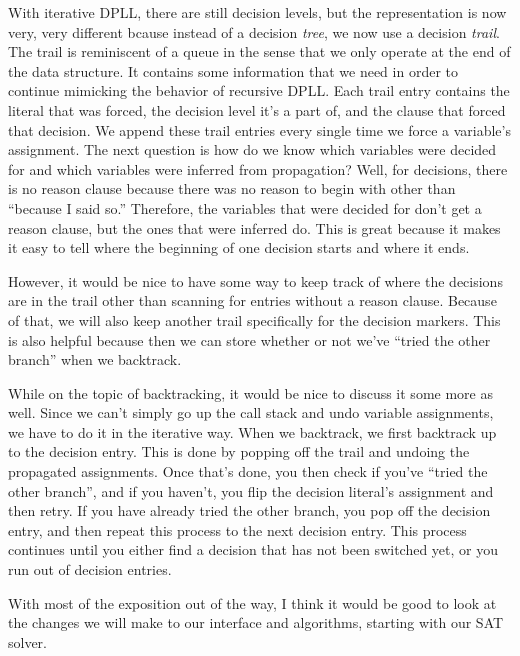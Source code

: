\documentclass[oneside]{book}
\begin{document}
With iterative DPLL, there are still decision levels, but the representation is 
now very, very different bcause instead of a decision \textit{tree}, we now use a 
decision \textit{trail}. The trail is reminiscent of a queue in the sense that 
we only operate at the end of the data structure. It contains some information 
that we need in order to continue mimicking the behavior of recursive DPLL. Each 
trail entry contains the literal that was forced, the decision level it's a part of,
and the clause that forced that decision. We append these trail entries every single 
time we force a variable's assignment. The next question is how do we know which 
variables were decided for and which variables were inferred from propagation?
Well, for decisions, there is no reason clause because there was no reason to 
begin with other than ``because I said so.'' Therefore, the variables that were 
decided for don't get a reason clause, but the ones that were inferred do. This 
is great because it makes it easy to tell where the beginning of one decision 
starts and where it ends.

However, it would be nice to have some way to keep track of where the decisions
are in the trail other than scanning for entries without a reason clause. Because 
of that, we will also keep another trail specifically for the decision markers.
This is also helpful because then we can store whether or not we've ``tried the 
other branch'' when we backtrack. 

While on the topic of backtracking, it would be nice to discuss it some more as well. 
Since we can't simply go up the call stack and undo variable assignments, we have to 
do it in the iterative way. When we backtrack, we first backtrack up to the decision
entry. This is done by popping off the trail and undoing the propagated assignments. 
Once that's done, you then check if you've ``tried the other branch'', and if you 
haven't, you flip the decision literal's assignment and then retry. If you have 
already tried the other branch, you pop off the decision entry, and then repeat 
this process to the next decision entry. This process continues until you either 
find a decision that has not been switched yet, or you run out of decision 
entries.

With most of the exposition out of the way, I think it would be good to 
look at the changes we will make to our interface and algorithms, starting 
with our SAT solver.
\end{document}
